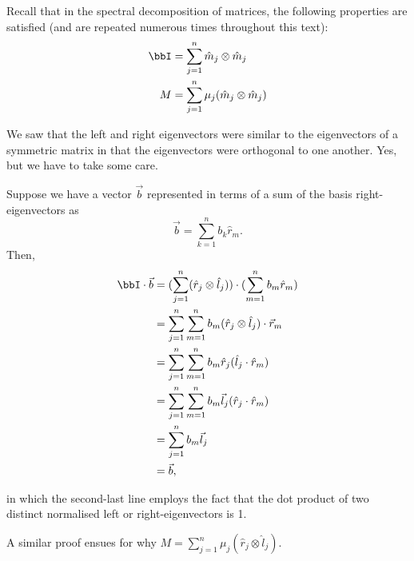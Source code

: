 \documentclass[a4paper, 12pt,oneside,openany]{book}
\begin{document}
Recall that in the spectral decomposition of matrices, the following properties are satisfied (and are repeated numerous times throughout this text): \begin{align*} \bbI &= \sum\limits_{j=1}^n  \hat{m}_j \otimes \hat{m}_j  \\ M &= \sum\limits_{j=1}^n  \mu_j (\hat{m}_j \otimes \hat{m}_j) \end{align*}

We saw that the left and right eigenvectors were similar to the eigenvectors of a symmetric matrix in that the eigenvectors were orthogonal to one another. Yes, but we have to take some care.


 Suppose we have a vector $\vec{b}$ represented in terms of a sum of the basis right-eigenvectors as $$\vec{b} = \sum\limits_{k=1}^n b_k \hat{r}_m.$$ Then, \begin{align*} \bbI \cdot \vec{b} &= (\sum\limits_{j=1}^n (\hat{r}_j \otimes \hat{l}_j))\cdot (\sum\limits_{m=1}^n b_m \hat{r}_m) \\ &= \sum\limits_{j=1}^n \sum\limits_{m=1}^n b_m (\hat{r}_j \otimes \hat{l}_j) \cdot \vec{r}_m \\ &= \sum\limits_{j=1}^n \sum\limits_{m=1}^n b_m \hat{r}_j (\hat{l}_j \cdot \hat{r}_m) \\ &= \sum\limits_{j=1}^n \sum\limits_{m=1}^n b_m \vec{l}_j (\hat{r}_j \cdot \hat{r}_m) \\ &=  \sum\limits_{j=1}^n  b_m \vec{l}_j \\ &= \vec{b},\end{align*}

in which the second-last line employs the fact that the dot product of two distinct normalised left or right-eigenvectors is 1.

A similar proof ensues for why $M = \sum\limits_{j=1}^n  \mu_j (\hat{r}_j \otimes \hat{l}_j).$
\end{document}
